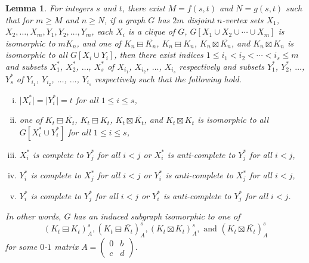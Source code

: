 \documentclass[11pt]{article}
\newtheorem{lemma}[theorem]{Lemma}
\newcommand\abs[1]{\lvert #1\rvert}
\newcommand\mat{\boxminus}
\newcommand\antimat{\boxtimes}
\def\S_#1{\overline{K_{#1}}}
\begin{document}
\begin{lemma}\label{lem:dcm}
  For integers $s$ and $t$, there exist $M=f(s,t)$ and $N=g(s,t)$
  such that
  for $m\ge M$ and $n\ge N$, 
  if a graph $G$ has $2m$ disjoint $n$-vertex sets 
  $X_1$, $X_2,\ldots, X_m,Y_1,Y_2,\ldots,  Y_m$,
  each $X_i$ is a clique of $G$, 
  $G[X_1\cup X_2\cup \cdots\cup X_m]$ is isomorphic to $mK_n$,
  and
  one of $K_n\mat \S_n$,
  $K_n\mat K_n$,  $K_n\antimat \S_n$, 
  and $K_n\antimat K_n$
  is isomorphic to 
  all $G[X_i\cup Y_i]$,
  then
  there exist indices $1\le i_1<i_2<\cdots<i_s\le m$
  and subsets $X_1^*$, $X_2^*$, $\ldots$, $X_s^*$ of $X_{i_1}$, $X_{i_2}$, $\ldots$, $X_{i_s}$ respectively
  and subsets $Y_1^*$, $Y_2^*$, $\ldots$, $Y_s^*$ of $Y_{i_1}$, $Y_{i_2}$, $\ldots$,
  $\ldots$, $Y_{i_s}$ respectively
  such that the following hold.
  \begin{enumerate}[(i)]
  \item $\abs{X_i^*}=\abs{Y_i^*}=t$ for all $1\le i\le s$,
  \item   one of $K_t\mat \S_t$,
    $K_t\mat K_t$,  $K_t\antimat \S_t$, 
    and $K_t\antimat K_t$
    is isomorphic to 
    all $G[X_i^*\cup Y_i^*]$ for all $1\le i\le s$,
  \item $X_i^*$ is complete to $Y_j^*$ for all $i<j$
    or $X_i^*$ is anti-complete to $Y_j^*$ for all $i<j$,
  \item $Y_i^*$ is complete to $X_j^*$ for all $i<j$
    or $Y_i^*$ is anti-complete to $X_j^*$ for all $i<j$,
  \item $Y_i^*$ is complete to $Y_j^*$ for all $i<j$
    or $Y_i^*$ is anti-complete to $Y_j^*$ for all $i<j$.
  \end{enumerate}
  In other words, $G$ has an induced subgraph isomorphic to
  one of
  \[(K_t\mat K_t)^s_A,
  (K_t\mat \S_t)^s_A,
  (K_t\antimat K_t)^s_A, \text{ and }
  (K_t\antimat \S_t)^s_A\]
  for some $0$-$1$ matrix $A=
  (\begin{smallmatrix}
    0&b \\c&d 
  \end{smallmatrix})$.
\end{lemma}
\end{document}
